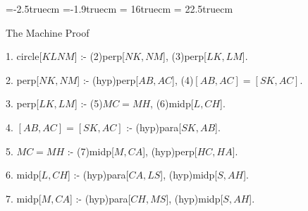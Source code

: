\voffset=-2.5truecm
\hoffset=-1.9truecm
\textwidth = 16truecm
\textheight = 22.5truecm
\parskip=8pt
\parindent=15pt
\def\fa#1#2{\langle{#1},{#2}\rangle}


{\vskip6pt \parskip=6pt \parindent=10pt 
The Machine Proof


1. circle[$KLNM$] :- (2)perp[$NK,NM$], (3)perp[$LK,LM$].

2. perp[$NK,NM$] :- (hyp)perp[$AB,AC$], (4)$[AB,AC]=[SK,AC]$.

3. perp[$LK,LM$] :- (5)$MC = MH$, (6)midp[$L,CH$].

4. $[AB,AC]=[SK,AC]$ :- (hyp)para[$SK,AB$].

5. $MC = MH$ :- (7)midp[$M,CA$], (hyp)perp[$HC,HA$].

6. midp[$L,CH$] :- (hyp)para[$CA,LS$], (hyp)midp[$S,AH$].

7. midp[$M,CA$] :- (hyp)para[$CH,MS$], (hyp)midp[$S,AH$].
}

